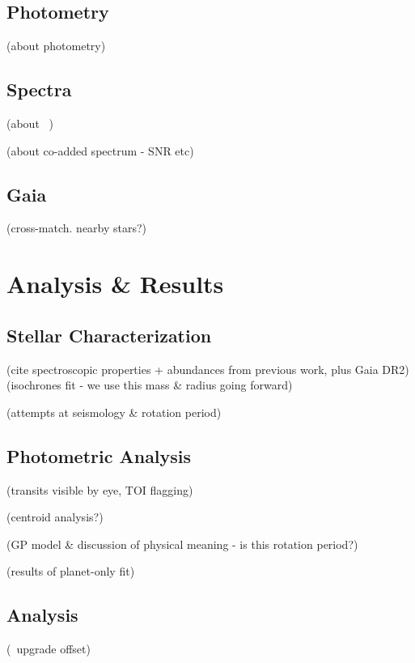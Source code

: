 \documentclass[modern]{aastex62}
\begin{document}
\subsection{Photometry}

(about \TESS photometry)

\subsection{Spectra}

(about \HARPS\ \RVs)

(about co-added spectrum - SNR etc)

\subsection{Gaia}

(cross-match. nearby stars?)

\section{Analysis \& Results}
\label{s:analysis}

\subsection{Stellar Characterization}
\label{s:analysis:star}


(cite spectroscopic properties + abundances from previous work, plus Gaia DR2)
(isochrones fit - we use this mass \& radius going forward)

(attempts at seismology \& rotation period)

\subsection{Photometric Analysis}
\label{s:analysis:photometry}

(transits visible by eye, TOI flagging)

(centroid analysis?)

(GP model \& discussion of physical meaning - is this rotation period?)

(results of planet-only fit)

\subsection{\RV Analysis}
\label{s:analysis:rvs}

(\HARPS\ upgrade offset)
\end{document}
